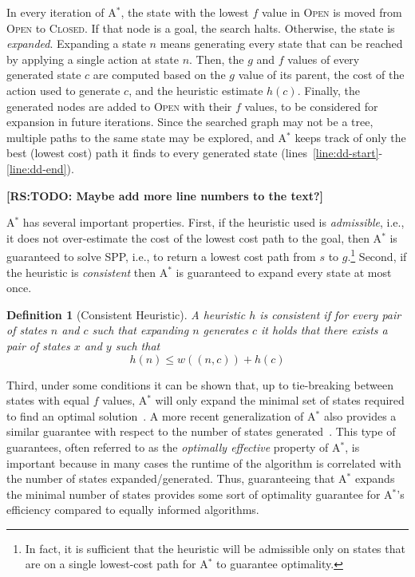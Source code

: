 \documentclass{aicom2e}
\newtheorem{definition}{Definition}
\newcommand{\astar}{A$^*$}
\newcommand{\open}{\textsc{Open}}
\newcommand{\closed}{\textsc{Closed}}
\newcommand{\roni}[1]{\textbf{[RS:#1]}}
\begin{document}
In every iteration of \astar{}, the state with the lowest $f$ value in \open{} is moved from \open{} to \closed{}. 
If that node is a goal, the search halts. Otherwise, the state is {\em expanded}.  
Expanding a state $n$ means generating every state that can be reached by applying a single action at state $n$. 
Then, the $g$ and $f$ values of every generated state $c$ are computed based on the $g$ value of its parent, the cost of the action used to generate $c$, and the heuristic estimate $h(c)$. Finally, the generated nodes are added to \open{} with their $f$ values, to be considered for expansion in future iterations. Since the searched graph may not be a tree, multiple paths to the same state may be explored, and \astar{} keeps track of only the best (lowest cost) path it finds to every generated state (lines~\ref{line:dd-start}-\ref{line:dd-end}).  


\roni{TODO: Maybe add more line numbers to the text?}

\astar{} has several important properties. First, if the heuristic used is {\em admissible}, i.e., it does not over-estimate the cost of the lowest cost path to the goal, then \astar{} is guaranteed to solve SPP, i.e., to return a lowest cost path from $s$ to $g$.\footnote{In fact, it is sufficient that the heuristic will be admissible only on states that are on a single lowest-cost path for \astar{} to guarantee optimality.} 
Second, if the heuristic is {\em consistent} then \astar{} is guaranteed to expand every state at most once. 
\begin{definition}[Consistent Heuristic]
	A heuristic $h$ is consistent if for every pair of states $n$ and $c$ such that expanding $n$ generates $c$ 
	it holds that there exists a pair of states $x$ and $y$ such that
	\[ h(n)\leq w((n,c))+h(c) \]
	\label{def:consistent}
\end{definition}
Third, under some conditions it can be shown that, up to tie-breaking between states with equal $f$ values, \astar{} will only expand the minimal set of states required to find an optimal solution~\cite{dechter1985generalizedBestFirst}. 
A more recent generalization of \astar{} also provides a similar guarantee with respect to the number of states generated~\cite{Goldenberg}. This type of guarantees, often referred to as the {\em optimally effective} property of \astar{}, is  important because in many cases the runtime of the algorithm is correlated with the number of states expanded/generated. 
Thus, guaranteeing that \astar{} expands the minimal number of states provides some sort of optimality guarantee for \astar{}'s efficiency compared to equally informed algorithms. 
\end{document}
